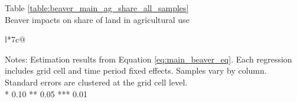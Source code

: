 \begin{table}[htb]
\captionlistentry[table]{}
\label{table:beaver_main_ag_share_all_samples}
\centering
Table \ref{table:beaver_main_ag_share_all_samples} \\
Beaver impacts on share of land in agricultural use \\
\begin{threeparttable}
\begin{tabulary}{\textwidth}{l*{7}{c}@{}}
\toprule \toprule
\noalign{\smallskip}
\noalign{\smallskip}
\midrule \bottomrule
\end{tabulary}
\medskip
\begin{tablenotes}[flushleft]
\setlength{}
\item
\footnotesize
\justify
Notes: Estimation results from Equation \eqref{eq:main_beaver_eq}.
Each regression includes grid cell and time period fixed effects.
Samples vary by column.
Standard errors are clustered at the grid cell level.  \\
\mbox{*} 0.10 ** 0.05 *** 0.01
\end{tablenotes}
\end{threeparttable}
\end{table}
